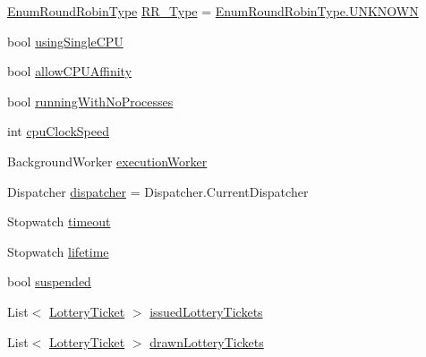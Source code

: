 \begin{DoxyCompactItemize}
\item 
\hyperlink{namespace_c_p_u___o_s___simulator_1_1_operating___system_a4c7effb8b6725df52018a3a14cede96e}{Enum\+Round\+Robin\+Type} \hyperlink{class_c_p_u___o_s___simulator_1_1_operating___system_1_1_scheduler_afa5f282549e500f0444d12048bdc31c9}{R\+R\+\_\+\+Type} = \hyperlink{namespace_c_p_u___o_s___simulator_1_1_operating___system_aea0b669d1bbf5690ae34ac2f8bef9470a696b031073e74bf2cb98e5ef201d4aa3}{Enum\+Round\+Robin\+Type.\+U\+N\+K\+N\+O\+W\+N}
\item 
bool \hyperlink{class_c_p_u___o_s___simulator_1_1_operating___system_1_1_scheduler_acd5c163fd74bd9e7ad4cbeb7f55c0338}{using\+Single\+C\+P\+U}
\item 
bool \hyperlink{class_c_p_u___o_s___simulator_1_1_operating___system_1_1_scheduler_a732d4b0d95cad3e280f9b69dd4f9f7c4}{allow\+C\+P\+U\+Affinity}
\item 
bool \hyperlink{class_c_p_u___o_s___simulator_1_1_operating___system_1_1_scheduler_af3276e8686d9efa7f8da6e48257922e3}{running\+With\+No\+Processes}
\item 
int \hyperlink{class_c_p_u___o_s___simulator_1_1_operating___system_1_1_scheduler_ae1829f5340f76cad2150c9e1f9ab3c69}{cpu\+Clock\+Speed}
\item 
Background\+Worker \hyperlink{class_c_p_u___o_s___simulator_1_1_operating___system_1_1_scheduler_a8b68cea278d24fcc12c6721210fe8dcb}{execution\+Worker}
\item 
Dispatcher \hyperlink{class_c_p_u___o_s___simulator_1_1_operating___system_1_1_scheduler_ab29898ad206dbc3a62234321cefe73ee}{dispatcher} = Dispatcher.\+Current\+Dispatcher
\item 
Stopwatch \hyperlink{class_c_p_u___o_s___simulator_1_1_operating___system_1_1_scheduler_adbb08b11d6d774001e688db129336719}{timeout}
\item 
Stopwatch \hyperlink{class_c_p_u___o_s___simulator_1_1_operating___system_1_1_scheduler_a765eabf93b7584d7d1476d18f283a85e}{lifetime}
\item 
bool \hyperlink{class_c_p_u___o_s___simulator_1_1_operating___system_1_1_scheduler_a844b64fe6c3917f055b61c4620995b74}{suspended}
\item 
List$<$ \hyperlink{class_c_p_u___o_s___simulator_1_1_operating___system_1_1_lottery_ticket}{Lottery\+Ticket} $>$ \hyperlink{class_c_p_u___o_s___simulator_1_1_operating___system_1_1_scheduler_a2cc17fd33517614da823a344f54cdd7c}{issued\+Lottery\+Tickets}
\item 
List$<$ \hyperlink{class_c_p_u___o_s___simulator_1_1_operating___system_1_1_lottery_ticket}{Lottery\+Ticket} $>$ \hyperlink{class_c_p_u___o_s___simulator_1_1_operating___system_1_1_scheduler_ac3e38df2939f98dd2e91b979329376ab}{drawn\+Lottery\+Tickets}
\end{DoxyCompactItemize}


